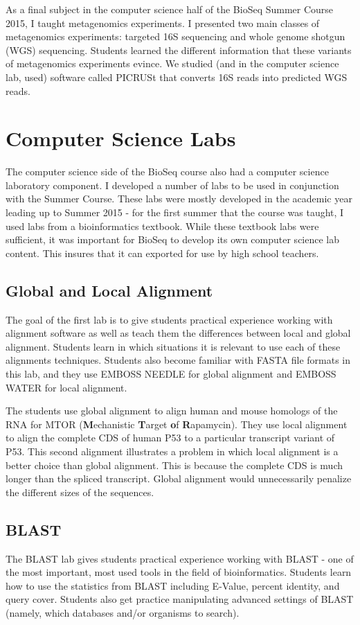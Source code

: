 \documentclass{report}
\begin{document}
As a final subject in the computer science half of the BioSeq Summer Course 2015, I taught metagenomics experiments. I presented two main classes of metagenomics experiments: targeted 16S sequencing and whole genome shotgun (WGS) sequencing. Students learned the different information that these variants of metagenomics experiments evince. We studied (and in the computer science lab, used) software called PICRUSt that converts 16S reads into predicted WGS reads. 

\section{Computer Science Labs}
The computer science side of the BioSeq course also had a computer science laboratory component. I developed a number of labs to be used in conjunction with the Summer Course. These labs were mostly developed in the academic year leading up to Summer 2015 - for the first summer that the course was taught, I used labs from a bioinformatics textbook. While these textbook labs were sufficient, it was important for BioSeq to develop its own computer science lab content. This insures that it can exported for use by high school teachers.


\subsection{Global and Local Alignment}
The goal of the first lab is to give students practical experience working with alignment software as well as teach them the differences between local and global alignment. Students learn in which situations it is relevant to use each of these alignments techniques. Students also become familiar with FASTA file formats in this lab, and they use EMBOSS NEEDLE for global alignment and EMBOSS WATER for local alignment.

The students use global alignment to align human and mouse homologs of the RNA for MTOR (\textbf{M}echanistic \textbf{T}arget \textbf{o}f \textbf{R}apamycin). They use local alignment to align the complete CDS of human P53 to a particular transcript variant of P53. This second alignment illustrates a problem in which local alignment is a better choice than global alignment. This is because the complete CDS is much longer than the spliced transcript. Global alignment would unnecessarily penalize the different sizes of the sequences. 

\subsection{BLAST}
The BLAST lab gives students practical experience working with BLAST - one of the most important, most used tools in the field of bioinformatics. Students learn how to use the statistics from BLAST including E-Value, percent identity, and query cover. Students also get practice manipulating advanced settings of BLAST (namely, which databases and/or organisms to search).
\end{document}
